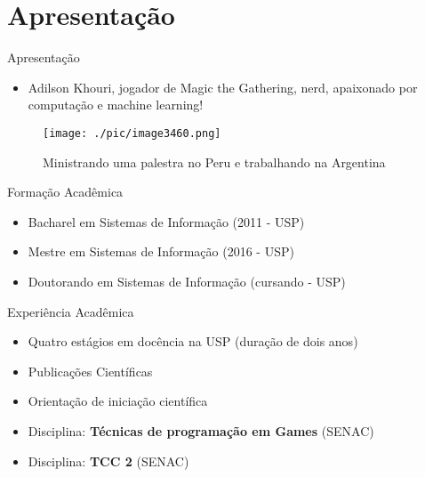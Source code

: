 \section{Apresentação}

\begin{frame}	
	\begin{block}{Apresentação}	
		\begin{itemize}
			\item Adilson Khouri,  jogador de Magic the Gathering, nerd, apaixonado por computação e machine learning!
		\end{itemize}
		 \begin{figure}[!htb]
			\centering	  				
			\texttt{[image: ./pic/image3460.png]}
			\caption{Ministrando uma palestra no Peru e trabalhando na Argentina}
			\label{fig_adilson_argentina}
		\end{figure}
	\end{block}
\end{frame}
			
\begin{frame}	
	\begin{block}{Formação Acadêmica}
		 \begin{itemize}
			  \item Bacharel em Sistemas de Informação (2011 - USP)
			  \item Mestre em Sistemas de Informação (2016 - USP)
			  \item Doutorando em Sistemas de Informação (cursando - USP)
		  \end{itemize}
	\end{block}
\end{frame}

\begin{frame}	
	\begin{block}{Experiência Acadêmica}
		 \begin{itemize}
			  \item Quatro estágios em docência na USP (duração de dois anos) 
			  \item Publicações Científicas
			  \item Orientação de iniciação científica
			  \item Disciplina: \textbf{Técnicas de programação em Games} (SENAC)
			  \item Disciplina: \textbf{TCC 2} (SENAC)
		  \end{itemize}
	\end{block}
\end{frame}

